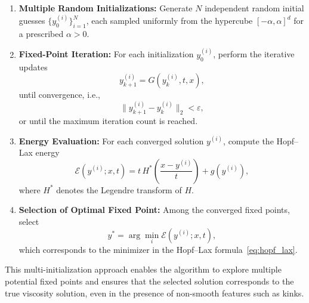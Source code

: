 \documentclass[review,hidelinks,onefignum,onetabnum]{siamart250106}
\begin{document}
\begin{enumerate}
    \item \textbf{Multiple Random Initializations:} 
    Generate $N$ independent random initial guesses 
    $\{ y_0^{(i)} \}_{i=1}^N$, each sampled uniformly from the hypercube 
    $[-\alpha, \alpha]^d$ for a prescribed $\alpha > 0$.

    \item \textbf{Fixed-Point Iteration:} 
    For each initialization $y_0^{(i)}$, perform the iterative updates
    \[
        y_{k+1}^{(i)} = G(y_k^{(i)}, t, x),
    \]
    until convergence, i.e.,
    \[
        \| y_{k+1}^{(i)} - y_k^{(i)} \|_2 < \varepsilon,
    \]
    or until the maximum iteration count is reached.

    \item \textbf{Energy Evaluation:}
    For each converged solution $y^{(i)}$, compute the Hopf--Lax energy
    \[
        \mathcal{E}(y^{(i)}; x, t) 
        = t\,H^\ast\!\left( \frac{x - y^{(i)}}{t} \right)
        + g\!\left( y^{(i)} \right),
    \]
    where $H^\ast$ denotes the Legendre transform of $H$.

    \item \textbf{Selection of Optimal Fixed Point:}
    Among the converged fixed points, select
    \[
        y^\ast = \arg\min_{i} \mathcal{E}(y^{(i)}; x, t),
    \]
    which corresponds to the minimizer in the Hopf--Lax formula~\eqref{eq:hopf_lax}.
\end{enumerate}

This multi-initialization approach enables the algorithm to explore multiple potential fixed points and ensures that the selected solution corresponds to the true viscosity solution, even in the presence of non-smooth features such as kinks.
\end{document}
